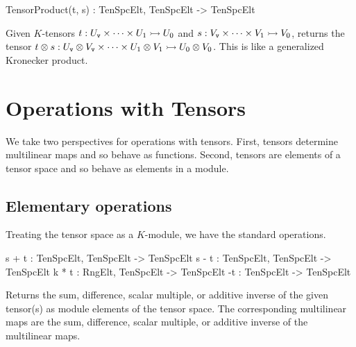 \begin{intrinsics}
TensorProduct(t, s) : TenSpcElt, TenSpcElt -> TenSpcElt
\end{intrinsics}

Given $K$-tensors $t:U_{\operatorname{\mathtt{v}}}\times \cdots \times U_1\rightarrowtail U_0$ and
$s:V_{\operatorname{\mathtt{v}}}\times \cdots \times V_1\rightarrowtail V_0$, returns the tensor
$t\otimes s : U_{\operatorname{\mathtt{v}}}\otimes V_{\operatorname{\mathtt{v}}}\times \cdots \times U_1\otimes
V_1\rightarrowtail U_0\otimes V_0$. This is like a generalized Kronecker
product. 


\section{Operations with Tensors}

We take two perspectives for operations with tensors. 
First, tensors determine multilinear maps and so behave as
functions.  Second, tensors are elements of a tensor space and 
so behave as elements in a module.  

\subsection{Elementary operations}
Treating the tensor space as a $K$-module, we have the standard operations.

\index{$+$}
\begin{intrinsics}
s + t : TenSpcElt, TenSpcElt -> TenSpcElt
s - t : TenSpcElt, TenSpcElt -> TenSpcElt
k * t : RngElt, TenSpcElt -> TenSpcElt
-t : TenSpcElt -> TenSpcElt
\end{intrinsics}

Returns the sum, difference, scalar multiple, or additive inverse of the given
tensor(s) as module elements of the tensor space. The corresponding multilinear
maps are the sum, difference, scalar multiple, or additive inverse of the
multilinear maps.

